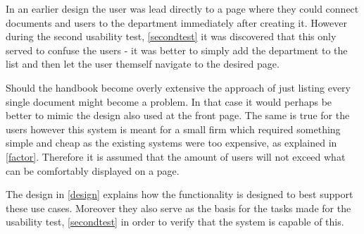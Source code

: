 


In an earlier design the user was lead directly to a page where they could connect documents and users to the department immediately after creating it.
However during the second usability test, \cref{secondtest} it was discovered that this only served to confuse the users - it was better to simply add the department to the list and then let the user themself navigate to the desired page.

Should the handbook become overly extensive the approach of just listing every single document might become a problem. In that case it would perhaps be better to mimic the design also used at the front page. The same is true for the users however this system is meant for a small firm which required something simple and cheap as the existing systems were too expensive, as explained in \cref{factor}. Therefore it is assumed that the amount of users will not exceed what can be comfortably displayed on a page.

The design in \cref{design} explains how the functionality is designed to best support these use cases. Moreover they also serve as the basis for the tasks made for the usability test, \cref{secondtest} in order to verify that the system is capable of this.